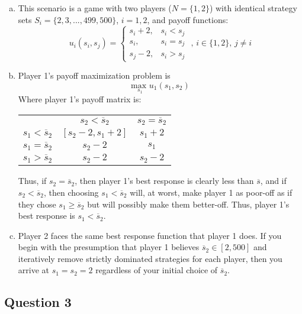 \documentclass{article}
\newcommand{\usmax}[1]{\underset{#1}{\text{max }}}
\begin{document}
\begin{enumerate}[(a)]
	\item This scenario is a game with two players ($N=\{1,2\}$) with identical strategy sets ${S_i=\{2,3,...,499,500\}}$, $i=1,2$, and payoff functions:
		\[
			u_i(s_i,s_j) = \begin{cases} s_i + 2, & s_i<s_j \\ s_i, & s_i = s_j \\ s_j - 2, & s_i>s_j \end{cases}\text{ , }i\in\{1,2\}\text{, }j\neq i
		\]
		
	\item Player 1's payoff maximization problem is 
		\[
			\usmax{s_1}u_1(s_1,s_2)
		\]
		Where player 1's payoff matrix is:
		\begin{center}
			\begin{tabular}{rcc}
									& $s_2 < \overline{s}_2$						& $s_2 = \overline{s}_2$			\\ \cline{2-3} 
			$s_1 < \overline{s}_2$	& \multicolumn{1}{|c|}{$[s_2 -2, s_1 + 2]$}		& \multicolumn{1}{|c|}{$s_1 + 2$}	\\ \cline{2-3}
			$s_1 = \overline{s}_2$	& \multicolumn{1}{|c|}{$s_2 - 2$}				& \multicolumn{1}{|c|}{$s_1$}		\\ \cline{2-3}
			$s_1 > \overline{s}_2$	& \multicolumn{1}{|c|}{$s_2 - 2$}				& \multicolumn{1}{|c|}{$s_2 - 2$}	\\ \cline{2-3}
			\end{tabular}
		\end{center}
		Thus, if $s_2=\overline{s}_2$, then player 1's best response is clearly less than $\overline{s}$, and if $s_2<\overline{s}_2$, then choosing $s_1<\overline{s}_2$ will, at worst, make player 1 as poor-off as if they chose $s_1\geq\overline{s}_2$ but will possibly make them better-off. Thus, player 1's best response is $s_1<\overline{s}_2$.
	
	\item Player 2 faces the same best response function that player 1 does. If you begin with the presumption that player 1 believes $\overline{s}_2\in[2,500]$ and iteratively remove strictly dominated strategies for each player, then you arrive at $s_1=s_2=2$ regardless of your initial choice of $\overline{s}_2$.
	
\end{enumerate}


\subsection*{Question 3}
\end{document}
